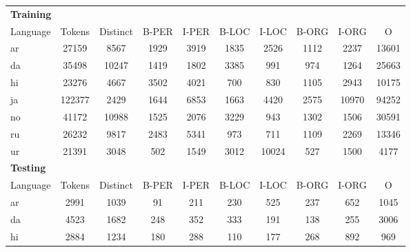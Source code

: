\begin{table}[h!]
    \centering
    \begin{tabular}{l c c c c c c c c c}
        \toprule
        \multicolumn{10}{l}{\bfseries Training} \\
        Language & Tokens & Distinct &
        B-PER & I-PER & B-LOC & I-LOC & B-ORG & I-ORG & O \\
        
        \cmidrule(lr){1-10}

        ar   &  27159 &  8567 &
        1929 &   3919 &  1835 &  2526 & 1112 &  2237 & 13601 \\

        da   &  35498 & 10247 &
        1419 &   1802 &  3385 &   991 &  974 &  1264 & 25663 \\

        hi   &  23276 &  4667 &
        3502 &   4021 &   700 &   830 & 1105 &  2943 & 10175 \\

        ja   & 122377 &  2429 &
        1644 &   6853 &  1663 &  4420 & 2575 & 10970 & 94252 \\

        no   &  41172 & 10988 &
        1525 &   2076 &  3229 &   943 & 1302 &  1506 & 30591 \\

        ru   &  26232 &  9817 &
        2483 &   5341 &   973 &   711 & 1109 &  2269 & 13346 \\

        ur   &  21391 &  3048 &
         502 &   1549 &   3012 & 10024 & 527 &  1500 &  4177 \\

        \cmidrule(lr){1-10}
        \multicolumn{10}{l}{\bfseries Testing} \\
        Language & Tokens & Distinct &
        B-PER & I-PER & B-LOC & I-LOC & B-ORG & I-ORG & O \\
        
        \cmidrule(lr){1-10}

        ar  & 2991 & 1039 &
         91 &  211 &  230 &  525 &  237 &  652 & 1045 \\

        da  & 4523 & 1682 &
        248 &  352 &  333 &  191 &  138 &  255 & 3006 \\

        hi  & 2884 & 1234 &
        180 &  288 &  110 &  177 &  268 &  892 &  969 \\


\end{tabular}
\end{table}
